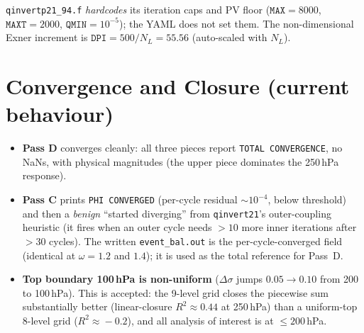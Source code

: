 \noindent \texttt{qinvertp21\_94.f} \emph{hardcodes} its iteration caps
and PV floor ($\texttt{MAX}=8000$, $\texttt{MAXT}=2000$,
$\texttt{QMIN}=10^{-5}$); the YAML does not set them.  The
non-dimensional Exner increment is $\texttt{DPI}=500/N_L=55.56$
(auto-scaled with $N_L$).

\section{Convergence and Closure (current behaviour)}
\label{sec:wu_converge}

\begin{itemize}\setlength\itemsep{2pt}
  \item \textbf{Pass D} converges cleanly: all three pieces report
        \texttt{TOTAL CONVERGENCE}, no NaNs, with physical magnitudes
        (the upper piece dominates the 250\,hPa response).
  \item \textbf{Pass C} prints \texttt{PHI CONVERGED} (per-cycle residual
        $\sim 10^{-4}$, below threshold) and then a \emph{benign}
        ``started diverging'' from \texttt{qinvert21}'s outer-coupling
        heuristic (it fires when an outer cycle needs $>\!10$ more inner
        iterations after $>\!30$ cycles).  The written
        \texttt{event\_bal.out} is the per-cycle-converged field
        (identical at $\omega=1.2$ and $1.4$); it is used as the total
        reference for Pass~D.
  \item \textbf{Top boundary 100\,hPa is non-uniform} ($\Delta\sigma$
        jumps $0.05\!\to\!0.10$ from 200 to 100\,hPa).  This is accepted:
        the 9-level grid closes the piecewise sum substantially better
        (linear-closure $R^2\!\approx\!0.44$ at 250\,hPa) than a
        uniform-top 8-level grid ($R^2\!\approx\!-0.2$), and all
        analysis of interest is at $\le 200$\,hPa.
\end{itemize}
